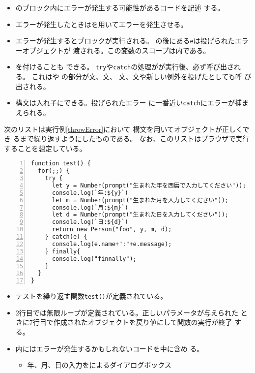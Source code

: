 \begin{frame}[containsverbatim]
\begin{itemize}
 \item {}のブロック内にエラーが発生する可能性があるコードを記述
       する。
 \item エラーが発生したときはを用いてエラーを発生させる。
 \item エラーが発生するとブロックが実行される。
       の後にある\texttt{e}は投げられたエラーオブジェクトが
       渡される。この変数のスコープは内である。
 \item {}を付けることも
       できる。%
       \texttt{try}や\texttt{catch}の処理がが実行後、必ず呼び出される。
       これはや
       の部分が文、文、
       文、文や新しい例外を投げたとしても呼
       び出される。
 \item {}構文は入れ子にできる。投げられたエラー
			 に一番近い\texttt{catch}にエラーが捕まえられる。
\end{itemize}
 \begin{Exec}\upshape
	次のリストは実行例\ref{throwError}において
  構文を用いてオブジェクトが正しくでき
	るまで繰り返すようにしたものである。
 なお、このリストはブラウザで実行することを想定している。
 \end{Exec}
\begin{Verbatim}[numbers=left]
function test() {
  for(;;) {
    try {
      let y = Number(prompt("生まれた年を西暦で入力してください"));
      console.log(`年:${y}`)
      let m = Number(prompt("生まれた月を入力してください"));
      console.log(`月:${m}`)
      let d = Number(prompt("生まれた日を入力してください"));
      console.log(`日:${d}`)
      return new Person("foo", y, m, d);
    } catch(e) {
      console.log(e.name+":"+e.message);
    } finally{
      console.log("finnally");
    }
  }
}
\end{Verbatim}
\begin{itemize}
 \item テストを繰り返す関数\texttt{test()}が定義されている。
 \item 2行目では無限ループが定義されている。正しいパラメータが与えられた
			 ときに7行目で作成されたオブジェクトを戻り値にして関数の実行が終了
			 する。
 \item {}内にはエラーが発生するかもしれないコードを中に含め
			 る。
	\begin{itemize}
	 \item 年、月、日の入力をによるダイアログボックス

\end{itemize}
\end{itemize}
\end{frame}
